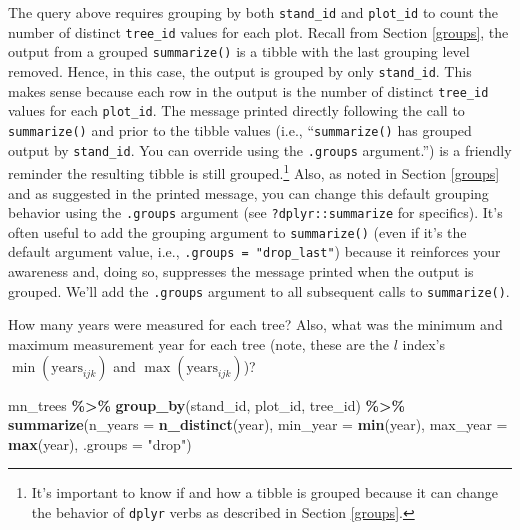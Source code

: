 \documentclass[
  11pt,
]{krantz}
\newenvironment{Shaded}{\begin{snugshade}}{\end{snugshade}}
\newcommand{\DataTypeTok}[1]{\textcolor[rgb]{0.13,0.29,0.53}{#1}}
\newcommand{\KeywordTok}[1]{\textcolor[rgb]{0.13,0.29,0.53}{\textbf{#1}}}
\newcommand{\NormalTok}[1]{#1}
\newcommand{\OperatorTok}[1]{\textcolor[rgb]{0.81,0.36,0.00}{\textbf{#1}}}
\newcommand{\StringTok}[1]{\textcolor[rgb]{0.31,0.60,0.02}{#1}}
\theoremstyle{definition}
\theoremstyle{definition}
\theoremstyle{definition}
\theoremstyle{definition}
\theoremstyle{remark}
\begin{document}
The query above requires grouping by both \texttt{stand\_id} and \texttt{plot\_id} to count the number of distinct \texttt{tree\_id} values for each plot. Recall from Section \ref{groups}, the output from a grouped \texttt{summarize()} is a tibble with the last grouping level removed. Hence, in this case, the output is grouped by only \texttt{stand\_id}. This makes sense because each row in the output is the number of distinct \texttt{tree\_id} values for each \texttt{plot\_id}. The message printed directly following the call to \texttt{summarize()} and prior to the tibble values (i.e., ``\texttt{summarize()} has grouped output by \texttt{stand\_id}. You can override using the \texttt{.groups} argument.'') is a friendly reminder the resulting tibble is still grouped.\footnote{It's important to know if and how a tibble is grouped because it can change the behavior of \texttt{dplyr} verbs as described in Section \ref{groups}.} Also, as noted in Section \ref{groups} and as suggested in the printed message, you can change this default grouping behavior using the \texttt{.groups} argument (see \texttt{?dplyr::summarize} for specifics). It's often useful to add the grouping argument to \texttt{summarize()} (even if it's the default argument value, i.e., \texttt{.groups\ =\ "drop\_last"}) because it reinforces your awareness and, doing so, suppresses the message printed when the output is grouped. We'll add the \texttt{.groups} argument to all subsequent calls to \texttt{summarize()}.

How many years were measured for each tree? Also, what was the minimum and maximum measurement year for each tree (note, these are the \(l\) index's \(\min(\text{years}_{ijk})\) and \(\max(\text{years}_{ijk})\))?

\begin{Shaded}
\begin{Highlighting}[]
\NormalTok{mn\_trees }\OperatorTok{\%\textgreater{}\%}\StringTok{ }\KeywordTok{group\_by}\NormalTok{(stand\_id, plot\_id, tree\_id) }\OperatorTok{\%\textgreater{}\%}\StringTok{ }
\StringTok{  }\KeywordTok{summarize}\NormalTok{(}\DataTypeTok{n\_years =} \KeywordTok{n\_distinct}\NormalTok{(year), }
            \DataTypeTok{min\_year =} \KeywordTok{min}\NormalTok{(year), }
            \DataTypeTok{max\_year =} \KeywordTok{max}\NormalTok{(year),}
            \DataTypeTok{.groups =} \StringTok{"drop"}\NormalTok{)}
\end{Highlighting}
\end{Shaded}
\end{document}
